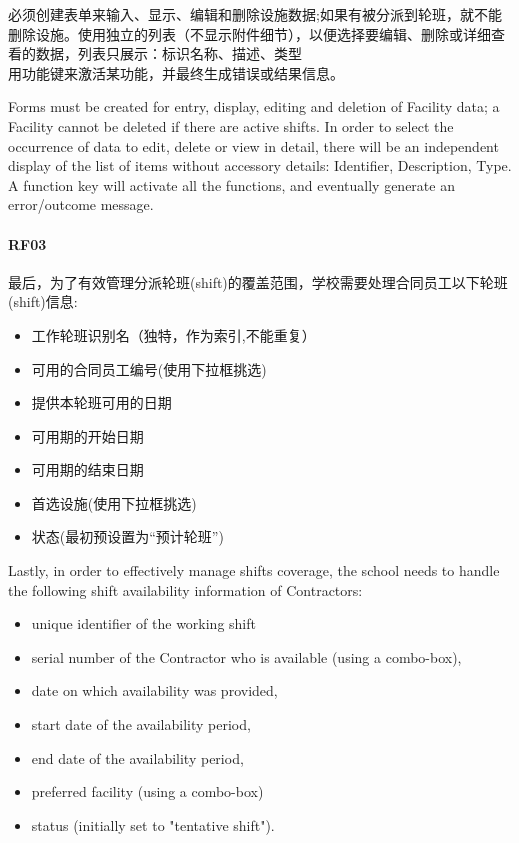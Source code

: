必须创建表单来输入、显示、编辑和删除设施数据;如果有被分派到轮班，就不能删除设施。使用独立的列表（不显示附件细节），以便选择要编辑、删除或详细查看的数据，列表只展示：标识名称、描述、类型\\
用功能键来激活某功能，并最终生成错误或结果信息。

Forms must be created for entry, display, editing and deletion of
Facility data; a Facility cannot be deleted if there are active shifts.
In order to select the occurrence of data to edit, delete or view in
detail, there will be an independent display of the list of items
without accessory details: Identifier, Description, Type. A function key
will activate all the functions, and eventually generate an
error/outcome message.

\hypertarget{rf03}{%
\paragraph{RF03}\label{rf03}}

最后，为了有效管理分派轮班(shift)的覆盖范围，学校需要处理合同员工以下轮班(shift)信息:

\begin{itemize}
\tightlist
\item
  工作轮班识别名（独特，作为索引,不能重复）
\item
  可用的合同员工编号(使用下拉框挑选)
\item
  提供本轮班可用的日期
\item
  可用期的开始日期
\item
  可用期的结束日期
\item
  首选设施(使用下拉框挑选)
\item
  状态(最初预设置为``预计轮班'')
\end{itemize}

Lastly, in order to effectively manage shifts coverage, the school needs
to handle the following shift availability information of Contractors:

\begin{itemize}
\tightlist
\item
  unique identifier of the working shift
\item
  serial number of the Contractor who is available (using a combo-box),
\item
  date on which availability was provided,
\item
  start date of the availability period,
\item
  end date of the availability period,
\item
  preferred facility (using a combo-box)
\item
  status (initially set to "tentative shift").
\end{itemize}

